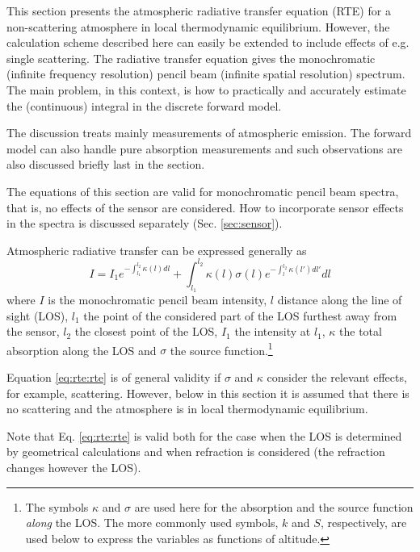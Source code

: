 %
%
This section presents the atmospheric radiative transfer equation
(RTE) for a non-scattering atmosphere in local thermodynamic
equilibrium.  However, the calculation scheme described here can
easily be extended to include effects of e.g. single scattering. The
radiative transfer equation gives the monochromatic (infinite
frequency resolution) pencil beam (infinite spatial resolution)
spectrum. The main problem, in this context, is how to practically and
accurately estimate the (continuous) integral in the discrete forward
model.
 
The discussion treats mainly measurements of atmospheric emission. The 
forward model can also handle pure absorption measurements and such 
observations are also discussed briefly last in the section.

The equations of this section are valid for monochromatic pencil beam
spectra, that is, no effects of the sensor are considered. How to
incorporate sensor effects in the spectra is discussed separately
(Sec. \ref{sec:sensor}).



 \label{sec:rte:intro}
 
 Atmospheric radiative transfer can be expressed generally as
 \begin{equation}
   I = I_1e^{-\int_{l_1}^{l_2}{\kappa(l)dl}} +
        \int_{l_1}^{l_2}{\kappa(l)\sigma(l)e^{-\int_{l}^{l_2}{\kappa(l')dl'}}dl}
    \label{eq:rte:rte}
 \end{equation}
 where $I$ is the monochromatic pencil beam intensity, $l$ distance
 along the line of sight (LOS), $l_1$ the point of the considered part
 of the LOS furthest away from the sensor, $l_2$ the closest point of
 the LOS, $I_1$ the intensity at $l_1$, $\kappa$ the total absorption
 along the LOS and $\sigma$ the source function.\footnote{The symbols
   $\kappa$ and $\sigma$ are used here for the absorption and the source 
   function \emph{along} the LOS. The more commonly used symbols, $k$ and
   $S$, respectively, are used below to express the variables as
   functions of altitude.}
  
 Equation \ref{eq:rte:rte} is of general validity if $\sigma$ and $\kappa$
 consider the relevant effects, for example, scattering. However, below in
 this section it is assumed that there is no scattering and the
 atmosphere is in local thermodynamic equilibrium.
  
 Note that Eq. \ref{eq:rte:rte} is valid both for the case when the LOS is
 determined by geometrical calculations and when refraction is
 considered (the refraction changes however the LOS).
  
